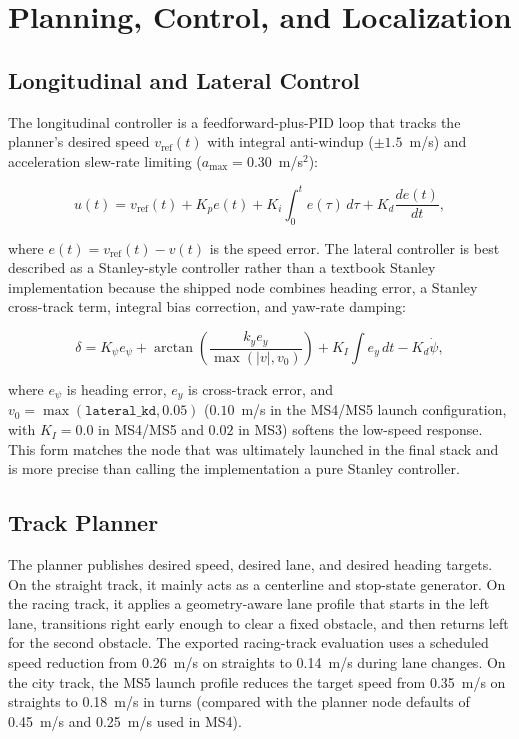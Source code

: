 \documentclass[conference]{IEEEtran}
\begin{document}
\section{Planning, Control, and Localization}
\label{sec:methods}

\subsection{Longitudinal and Lateral Control}

The longitudinal controller is a feedforward-plus-PID loop that tracks the
planner's desired speed $v_{\text{ref}}(t)$ with integral anti-windup
($\pm 1.5$~m/s) and acceleration slew-rate limiting ($a_{\max} = 0.30$~m/s$^2$):

\begin{equation}
  u(t) = v_{\text{ref}}(t) + K_p e(t) + K_i \int_0^t e(\tau)\,d\tau + K_d \frac{de(t)}{dt},
  \label{eq:pid_speed}
\end{equation}

where $e(t) = v_{\text{ref}}(t) - v(t)$ is the speed error. The lateral
controller is best described as a Stanley-style controller rather than a
textbook Stanley implementation because the shipped node combines heading error,
a Stanley cross-track term, integral bias correction, and yaw-rate damping:

\begin{equation}
  \delta = K_{\psi} e_{\psi} + \arctan\!\left(\frac{k_y e_y}{\max(|v|, v_0)}\right)
  + K_I \int e_y\,dt - K_d \dot{\psi},
  \label{eq:stanley_style}
\end{equation}

where $e_{\psi}$ is heading error, $e_y$ is cross-track error, and
$v_0 = \max(\texttt{lateral\_kd}, 0.05)$ ($0.10$~m/s in the MS4/MS5 launch
configuration, with $K_I = 0.0$ in MS4/MS5 and $0.02$ in MS3) softens the
low-speed response. This form matches the node that was ultimately
launched in the final stack and is more precise than calling the implementation
a pure Stanley controller.

\subsection{Track Planner}

The planner publishes desired speed, desired lane, and desired heading targets.
On the straight track, it mainly acts as a centerline and stop-state generator.
On the racing track, it applies a geometry-aware lane profile that starts in the
left lane, transitions right early enough to clear a fixed obstacle, and then
returns left for the second obstacle. The exported racing-track evaluation uses a
scheduled speed reduction from 0.26~m/s on straights to 0.14~m/s during lane
changes. On the city track, the MS5 launch profile reduces the target speed from
0.35~m/s on straights to 0.18~m/s in turns (compared with the planner node
defaults of 0.45~m/s and 0.25~m/s used in MS4).
\end{document}
